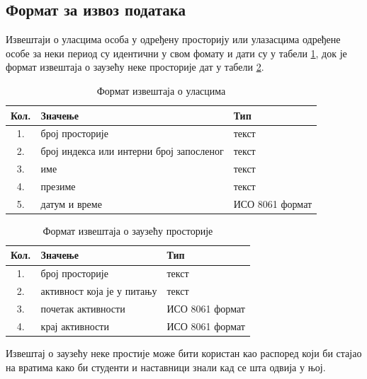 \documentclass[a4paper, 12pt, diplomski]{etfcyr}
\begin{document}
			\subsection{Формат за извоз података}
				\begin{justify}
					Извештаји о уласцима особа у одређену просторију или улазасцима одређене особе за неки период су идентични у свом фомату и дати су у табели \ref{table:4}, док је формат извештаја о заузећу неке просторије дат у табели \ref{table:5}.
					\begin{table}[H]
						\centering
						\begin{tabular}{ c l l }
							Кол. & Значење & Тип \\
							\hline
							1. & број просторије & текст \\
							2. & број индекса или интерни број запосленог & текст \\
							3. & име & текст \\
							4. & презиме & текст \\
							5. & датум и време & ИСО 8061 формат \\
						\end{tabular}
						\caption{Формат извештаја о уласцима}
						\label{table:4}
					\end{table}
					\begin{table}[H]
						\centering
						\begin{tabular}{ c l l }
							Кол. & Значење & Тип \\
							\hline
							1. & број просторије & текст \\
							2. & активност која је у питању & текст \\
							3. & почетак активности & ИСО 8061 формат \\
							4. & крај активности & ИСО 8061 формат \\
						\end{tabular}
						\caption{Формат извештаја о заузећу просторије}
						\label{table:5}
					\end{table}
					Извештај о заузећу неке простије може бити користан као распоред који би стајао на вратима како би студенти и наставници знали кад се шта одвија у њој.
				\end{justify}
\end{document}
